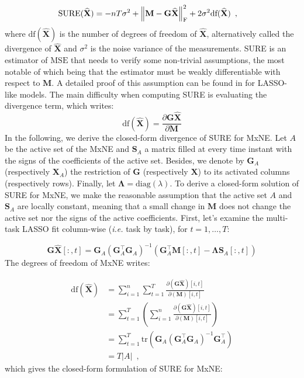 \begin{align} \label{eq:7}
    \text{SURE}(\widehat{\mathbf{X}})
    &= -nT\sigma^2 + \left \lVert 
        \mathbf{M} - \mathbf{G}\widehat{\mathbf{X}}
     \right \rVert_{\text{F}}^2
    + 2 \sigma^2 \text{df}(\widehat{\mathbf{X}})
    \enspace ,
\end{align}
%
where $\text{df}(\widehat{\mathbf{X}})$ is the number of degrees of freedom of $\widehat{\mathbf{X}}$,
alternatively called the divergence of $\widehat{\mathbf{X}}$ and $\sigma^2$ is the noise variance of the measurements. 
SURE is an estimator of $\text{MSE}$ that needs to verify some non-trivial assumptions, 
the most notable of which being that the estimator must be weakly differentiable with respect to $\mathbf{M}$. 
A detailed proof of this assumption can be found in \cite{Zou_Hastie_Tibshirani07}
for LASSO-like models. The main difficulty when computing SURE is evaluating the divergence term, which writes:
%
\begin{equation*}
    \text{df}(\widehat{\mathbf{X}}) 
    = 
    \frac{
        \partial \mathbf{G} \widehat{\mathbf{X}}
    }{
        \partial \mathbf{M}
    }
\end{equation*}
%
In the following, we derive the closed-form divergence of SURE for MxNE. Let $A$ be the active set 
of the MxNE and $\mathbf{S}_A$ a matrix filled at every time instant with the signs of the coefficients of the active set. 
Besides, we denote by $\mathbf{G}_A$ (respectively $\mathbf{X}_A$) the restriction of $\mathbf{G}$ (respectively $\mathbf{X}$) to its activated
columns (respectively rows). Finally, let $\mathbf{\Lambda} = \text{diag}(\lambda)$.
To derive a closed-form solution of SURE for MxNE, we make the reasonable assumption that the active set $A$ and $\mathbf{S}_A$ are locally constant, 
meaning that a small change in $\mathbf{M}$ does not change the active set nor the signs of the active 
coefficients. First, let's examine the multi-task LASSO fit column-wise (\textit{i.e.} task by task), for 
$t = 1, \dots, T$:

\begin{equation*}
    \mathbf{G\widehat{X}}[:, t]
    = \mathbf{G}_A (\mathbf{G}_A^{\top}\mathbf{G}_A)^{-1}
    \left(
        \mathbf{G}^{\top}_{A}\mathbf{M}[:, t]
        -
        \mathbf{\Lambda} \mathbf{S}_{A}[:, t]
    \right)
\end{equation*}
%
The degrees of freedom of MxNE writes:

\begin{align*}
    \text{df}(\widehat{\mathbf{X}}) 
    &= \sum_{i=1}^n \sum_{t=1}^T
    \frac{
        \partial (\mathbf{G}\widehat{\mathbf{X}})[i, t]
    }{
        \partial (\mathbf{M})[i, t]
    } \\
    &= \sum_{t=1}^T \left(
        \sum_{i=1}^n \frac{
            \partial (\mathbf{G}\widehat{\mathbf{X}})[i, t]
            }{
                \partial (\mathbf{M})[i, t]
            } 
    \right) \\
    &= \sum_{t=1}^T \text{tr}(
        \mathbf{G}_A (\mathbf{G}_A^{\top}\mathbf{G}_A)^{-1}\mathbf{G}_A^{\top}
    ) \\
    &= T \lvert A \rvert
    \enspace ,
\end{align*}
%
which gives the closed-form formulation of SURE for MxNE:

